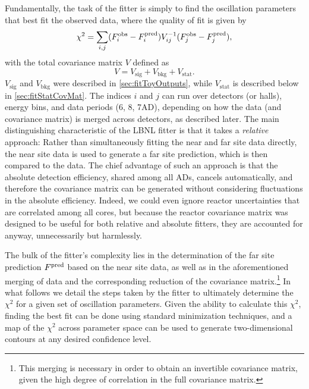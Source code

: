 \documentclass[../thesis.tex]{subfiles}
\begin{document}
Fundamentally, the task of the fitter is simply to find the oscillation parameters that best fit the observed data, where the quality of fit is given by
\begin{equation}
  \chi^2 = \sum_{i,j} (F^{\mathrm{obs}}_i - F^{\mathrm{pred}}_i) V^{-1}_{ij} (F^{\mathrm{obs}}_j - F^{\mathrm{pred}}_j),
\end{equation}
with the total covariance matrix $V$ defined as
\begin{equation}
  V = V_{\mathrm{sig}} + V_{\mathrm{bkg}} + V_{\mathrm{stat}}.
\end{equation}
$V_{\mathrm{sig}}$ and $V_{\mathrm{bkg}}$ were described in \autoref{sec:fitToyOutputs}, while $V_{\mathrm{stat}}$ is described below in \autoref{sec:fitStatCovMat}. The indices $i$ and $j$ can run over detectors (or halls), energy bins, and data periods (6, 8, 7AD), depending on how the data (and covariance matrix) is merged across detectors, as described later. The main distinguishing characteristic of the LBNL fitter is that it takes a \emph{relative} approach: Rather than simultaneously fitting the near and far site data directly, the near site data is used to generate a far site prediction, which is then compared to the data. The chief advantage of such an approach is that the absolute detection efficiency, shared among all ADs, cancels automatically, and therefore the covariance matrix can be generated without considering fluctuations in the absolute efficiency. Indeed, we could even ignore reactor uncertainties that are correlated among all cores, but because the reactor covariance matrix was designed to be useful for both relative and absolute fitters, they are accounted for anyway, unnecessarily but harmlessly.

The bulk of the fitter's complexity lies in the determination of the far site prediction $F^{\mathrm{pred}}$ based on the near site data, as well as in the aforementioned merging of data and the corresponding reduction of the covariance matrix.\footnote{This merging is necessary in order to obtain an invertible covariance matrix, given the high degree of correlation in the full covariance matrix.} In what follows we detail the steps taken by the fitter to ultimately determine the $\chi^2$ for a given set of oscillation parameters. Given the ability to calculate this $\chi^2$, finding the best fit can be done using standard minimization techniques, and a map of the $\chi^2$ across parameter space can be used to generate two-dimensional contours at any desired confidence level.

\begin{comment}
Compared to the toy Monte Carlo, the LBNL shape fitter is a relatively simple thing.

Its job is just to find the oscillation parameters that best fit the data, i.e. that give the lowest chi2.

It also produces a map of chi2 in parameter space for derivation of contours.
\end{comment}
\end{document}
